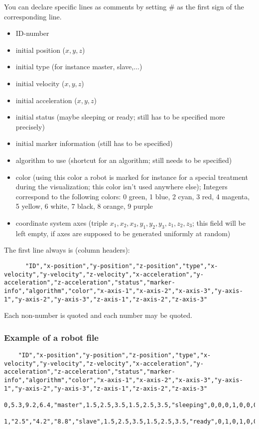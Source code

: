 You can declare specific lines as comments by setting \# as the first sign of
the corresponding line.
\begin{itemize}
	\item ID-number
	\item initial position ($x,y,z$)
	\item initial type (for instance master, slave,$\ldots$)
	\item initial velocity ($x,y,z$)
	\item initial acceleration ($x,y,z$)
	\item initial status (maybe sleeping or ready; still has to be specified more precisely)
	\item initial marker information (still has to be specified)
	\item algorithm to use (shortcut for an algorithm; still needs to be specified)
	\item color (using this color a robot is marked for instance for a special treatment during the visualization; this color isn't used anywhere else); Integers correspond to the following colors: 0 green, 1 blue, 2 cyan, 3 red, 4 magenta, 5 yellow, 6 white, 7 black, 8 orange, 9 purple
	\item coordinate system axes (triple $x_1,x_2,x_3,y_1,y_2,y_3,z_1,z_2,z_3$; this field will be left empty, if axes are supposed to be generated uniformly at random)
\end{itemize}
The first line always is (column headers):
\begin{lstlisting}
	  "ID","x-position","y-position","z-position","type","x-velocity","y-velocity","z-velocity","x-acceleration","y-acceleration","z-acceleration","status","marker-info","algorithm","color","x-axis-1","x-axis-2","x-axis-3","y-axis-1","y-axis-2","y-axis-3","z-axis-1","z-axis-2","z-axis-3"
\end{lstlisting}
Each non-number is quoted and each number may be quoted.

\subsubsection{Example of a robot file}
\begin{lstlisting}
	"ID","x-position","y-position","z-position","type","x-velocity","y-velocity","z-velocity","x-acceleration","y-acceleration","z-acceleration","status","marker-info","algorithm","color","x-axis-1","x-axis-2","x-axis-3","y-axis-1","y-axis-2","y-axis-3","z-axis-1","z-axis-2","z-axis-3"
	0,5.3,9.2,6.4,"master",1.5,2.5,3.5,1.5,2.5,3.5,"sleeping",0,0,0,1,0,0,0,1,0,0,0,1
	1,"2.5","4.2","8.8","slave",1.5,2.5,3.5,1.5,2.5,3.5,"ready",0,1,0,1,0,0,0,1,0,0,0,1
\end{lstlisting}

